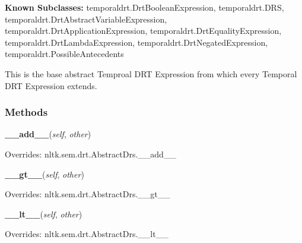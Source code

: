 \textbf{Known Subclasses:}
temporaldrt.DrtBooleanExpression,
    temporaldrt.DRS,
    temporaldrt.DrtAbstractVariableExpression,
    temporaldrt.DrtApplicationExpression,
    temporaldrt.DrtEqualityExpression,
    temporaldrt.DrtLambdaExpression,
    temporaldrt.DrtNegatedExpression,
    temporaldrt.PossibleAntecedents

This is the base abstract Temproal DRT Expression from which every Temporal
DRT Expression extends.



  \subsubsection{Methods}

    \vspace{0.5ex}

\hspace{.8\funcindent}\begin{boxedminipage}{\funcwidth}

    \raggedright \textbf{\_\_add\_\_}(\textit{self}, \textit{other})

\setlength{\parskip}{2ex}
\setlength{\parskip}{1ex}
      Overrides: nltk.sem.drt.AbstractDrs.\_\_add\_\_

    \end{boxedminipage}

    \vspace{0.5ex}

\hspace{.8\funcindent}\begin{boxedminipage}{\funcwidth}

    \raggedright \textbf{\_\_gt\_\_}(\textit{self}, \textit{other})

\setlength{\parskip}{2ex}
\setlength{\parskip}{1ex}
      Overrides: nltk.sem.drt.AbstractDrs.\_\_gt\_\_

    \end{boxedminipage}

    \vspace{0.5ex}

\hspace{.8\funcindent}\begin{boxedminipage}{\funcwidth}

    \raggedright \textbf{\_\_lt\_\_}(\textit{self}, \textit{other})

\setlength{\parskip}{2ex}
\setlength{\parskip}{1ex}
      Overrides: nltk.sem.drt.AbstractDrs.\_\_lt\_\_

    \end{boxedminipage}

